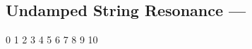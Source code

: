 \subsection[Undamped String Resonance]{Undamped String Resonance --- \UiKey{\I}\UiKey{\SET}}









































0
1
2
3
4
5
6
7
8
9
10
